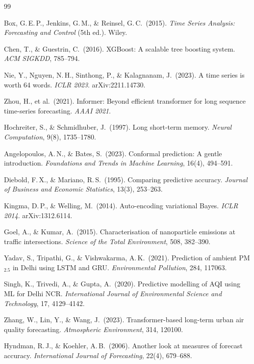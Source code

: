\documentclass[11pt,a4paper]{article}
\begin{document}
\begin{thebibliography}{99}

Box, G.\,E.\,P., Jenkins, G.\,M., \& Reinsel, G.\,C.\ (2015).
\textit{Time Series Analysis: Forecasting and Control} (5th ed.). Wiley.

Chen, T., \& Guestrin, C.\ (2016).
XGBoost: A scalable tree boosting system.
\textit{ACM SIGKDD}, 785--794.

Nie, Y., Nguyen, N.\,H., Sinthong, P., \& Kalagnanam, J.\ (2023).
A time series is worth 64 words.
\textit{ICLR 2023}. arXiv:2211.14730.

Zhou, H., et al.\ (2021).
Informer: Beyond efficient transformer for long sequence time-series forecasting.
\textit{AAAI 2021}.

Hochreiter, S., \& Schmidhuber, J.\ (1997).
Long short-term memory.
\textit{Neural Computation}, 9(8), 1735--1780.

Angelopoulos, A.\,N., \& Bates, S.\ (2023).
Conformal prediction: A gentle introduction.
\textit{Foundations and Trends in Machine Learning}, 16(4), 494--591.

Diebold, F.\,X., \& Mariano, R.\,S.\ (1995).
Comparing predictive accuracy.
\textit{Journal of Business and Economic Statistics}, 13(3), 253--263.

Kingma, D.\,P., \& Welling, M.\ (2014).
Auto-encoding variational Bayes.
\textit{ICLR 2014}. arXiv:1312.6114.

Goel, A., \& Kumar, A.\ (2015).
Characterisation of nanoparticle emissions at traffic intersections.
\textit{Science of the Total Environment}, 508, 382--390.

Yadav, S., Tripathi, G., \& Vishwakarma, A.\,K.\ (2021).
Prediction of ambient PM$_{2.5}$ in Delhi using LSTM and GRU.
\textit{Environmental Pollution}, 284, 117063.

Singh, K., Trivedi, A., \& Gupta, A.\ (2020).
Predictive modelling of AQI using ML for Delhi NCR.
\textit{International Journal of Environmental Science and Technology}, 17, 4129--4142.

Zhang, W., Lin, Y., \& Wang, J.\ (2023).
Transformer-based long-term urban air quality forecasting.
\textit{Atmospheric Environment}, 314, 120100.

Hyndman, R.\,J., \& Koehler, A.\,B.\ (2006).
Another look at measures of forecast accuracy.
\textit{International Journal of Forecasting}, 22(4), 679--688.

\end{thebibliography}
\end{document}
